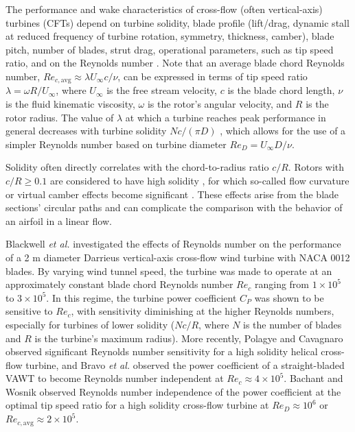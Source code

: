 The performance and wake characteristics of cross-flow (often vertical-axis)
turbines (CFTs) depend on turbine solidity, blade profile (lift/drag, dynamic
stall at reduced frequency of turbine rotation, symmetry, thickness, camber),
blade pitch, number of blades, strut drag, operational parameters, such as tip
speed ratio, and on the Reynolds number \cite{Para2002}. Note that an average
blade chord Reynolds number, $Re_{c,\mathrm{avg}} \approx \lambda U_\infty c/
\nu$, can be expressed in terms of tip speed ratio $\lambda = \omega R/
U_\infty$, where $U_\infty$ is the free stream velocity, $c$ is the blade chord
length, $\nu$ is the fluid kinematic viscosity, $\omega$ is the rotor's angular
velocity, and $R$ is the rotor radius. The value of $\lambda$ at which a turbine
reaches peak performance in general decreases with turbine solidity $Nc/(\pi D)$
\cite{Templin1974}, which allows for the use of a simpler Reynolds number based
on turbine diameter $Re_D = U_\infty D/\nu$.

Solidity often directly correlates with the chord-to-radius ratio $c/R$. Rotors
with $c/R \ge 0.1$ are considered to have high solidity \cite{Fiedler2009}, for which
so-called flow curvature or virtual camber effects become significant
\cite{Migliore1980}. These effects arise from the blade sections' circular
paths and can complicate the comparison with the behavior of an airfoil in a linear
flow.

Blackwell \emph{et al.} \cite{Blackwell1976} investigated the effects of
Reynolds number on the performance of a 2 m diameter Darrieus vertical-axis
cross-flow wind turbine with NACA 0012 blades. By varying wind tunnel speed, the
turbine was made to operate at an approximately constant blade chord Reynolds
number $Re_c$ ranging from $1 \times 10^5$ to $3 \times 10^5$. In this regime,
the turbine power coefficient $C_P$ was shown to be sensitive to $Re_c$, with
sensitivity diminishing at the higher Reynolds numbers, especially for turbines
of lower solidity ($Nc/R$, where $N$ is the number of blades and $R$ is the
turbine's maximum radius). More recently, Polagye and Cavagnaro
\cite{Polagye2013b} observed significant Reynolds number sensitivity for a high
solidity helical cross-flow turbine, and Bravo \emph{et al.} \cite{Bravo2007}
observed the power coefficient of a straight-bladed VAWT to become Reynolds
number independent at $Re_c \approx 4 \times 10^5$. Bachant and Wosnik
\cite{Bachant2014} observed Reynolds number independence of the power
coefficient at the optimal tip speed ratio for a high solidity cross-flow
turbine at $Re_D \approx 10^6$ or $Re_{c,\mathrm{avg}} \approx 2 \times 10^5$.

